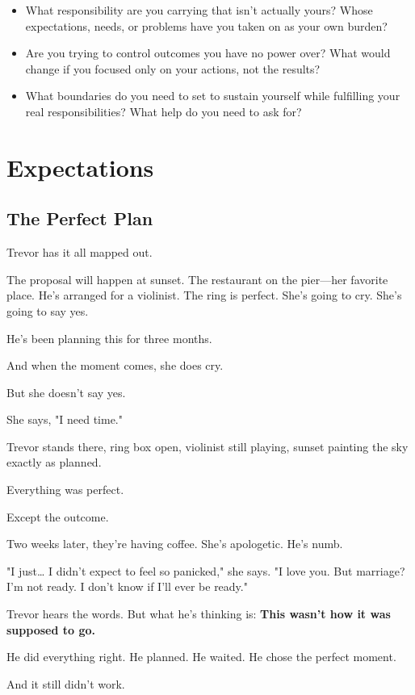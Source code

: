 \documentclass[11pt,twoside]{book}
\begin{document}
\begin{itemize}
\item What responsibility are you carrying that isn't actually yours? Whose expectations, needs, or problems have you taken on as your own burden?
\item Are you trying to control outcomes you have no power over? What would change if you focused only on your actions, not the results?
\item What boundaries do you need to set to sustain yourself while fulfilling your real responsibilities? What help do you need to ask for?
\end{itemize}

\chapter{Expectations}

\section*{The Perfect Plan}

Trevor has it all mapped out.

The proposal will happen at sunset. The restaurant on the pier—her favorite place. He's arranged for a violinist. The ring is perfect. She's going to cry. She's going to say yes.

He's been planning this for three months.

And when the moment comes, she does cry.

But she doesn't say yes.

She says, "I need time."

Trevor stands there, ring box open, violinist still playing, sunset painting the sky exactly as planned.

Everything was perfect.

Except the outcome.

Two weeks later, they're having coffee. She's apologetic. He's numb.

"I just… I didn't expect to feel so panicked," she says. "I love you. But marriage? I'm not ready. I don't know if I'll ever be ready."

Trevor hears the words. But what he's thinking is: \textbf{This wasn't how it was supposed to go.}

He did everything right. He planned. He waited. He chose the perfect moment.

And it still didn't work.
\end{document}
